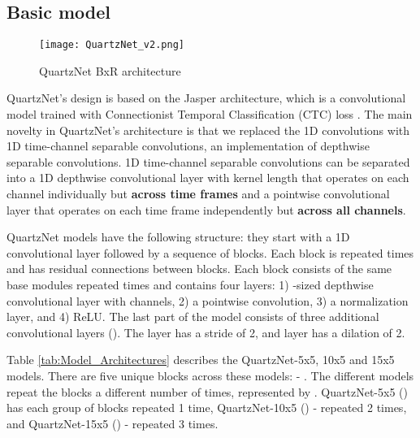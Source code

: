 \documentclass{article}
\begin{document}
\subsection{Basic model}
\begin{figure}[t]
 \centering
 \texttt{[image: QuartzNet\_v2.png]}
 \caption{QuartzNet BxR architecture}
 \label{fig:quartz_arch}
\end{figure}

QuartzNet's design is based on the Jasper \cite{li2019jasper} architecture, which is a convolutional model trained with Connectionist Temporal Classification (CTC) loss \cite{graves2006}. The main novelty in QuartzNet's architecture is that we replaced the 1D convolutions with 1D time-channel separable convolutions, an implementation of depthwise separable convolutions. 1D time-channel separable convolutions can be separated into a 1D depthwise convolutional layer with kernel length  that operates on each channel individually but \textbf{across  time frames} and a pointwise convolutional layer that operates on each time frame independently but \textbf{across all channels}.

QuartzNet models have the following structure: they start with a 1D convolutional layer  followed by a sequence of blocks. Each block  is repeated  times and has residual connections between blocks. Each block  consists of the same base modules repeated  times and contains four layers: 1) -sized depthwise convolutional layer with  channels, 2) a pointwise convolution, 3) a normalization layer, and 4) ReLU.  
The last part of the model consists of three additional convolutional layers (). The  layer has a stride of 2, and  layer has a dilation of 2. 

Table \ref{tab:Model_Architectures} describes the QuartzNet-5x5, 10x5 and 15x5 models. There are five unique blocks across these models:  - . The different models repeat the blocks a different number of times, represented by . QuartzNet-5x5 () has each group of blocks repeated 1 time, QuartzNet-10x5 () - repeated 2 times, and QuartzNet-15x5 () - repeated 3 times.
\end{document}
